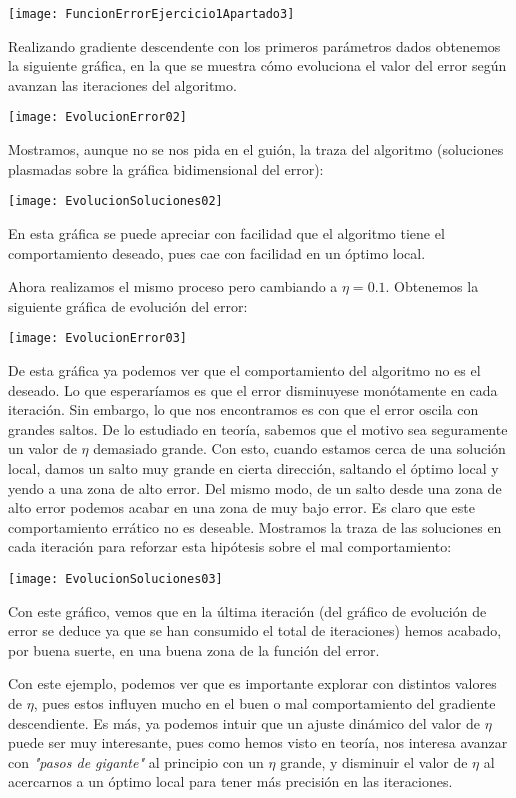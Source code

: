 \documentclass[11pt]{article}
\begin{document}
\texttt{[image: FuncionErrorEjercicio1Apartado3]}

Realizando gradiente descendente con los primeros parámetros dados obtenemos la siguiente gráfica, en la que se muestra cómo evoluciona el valor del error según avanzan las iteraciones del algoritmo.

\texttt{[image: EvolucionError02]}

Mostramos, aunque no se nos pida en el guión, la traza del algoritmo (soluciones plasmadas sobre la gráfica bidimensional del error):

\texttt{[image: EvolucionSoluciones02]}

En esta gráfica se puede apreciar con facilidad que el algoritmo tiene el comportamiento deseado, pues cae con facilidad en un óptimo local.

Ahora realizamos el mismo proceso pero cambiando a $\eta = 0.1$. Obtenemos la siguiente gráfica de evolución del error:

\texttt{[image: EvolucionError03]}

De esta gráfica ya podemos ver que el comportamiento del algoritmo no es el deseado. Lo que esperaríamos es que el error disminuyese monótamente en cada iteración. Sin embargo, lo que nos encontramos es con que el error oscila con grandes saltos. De lo estudiado en teoría, sabemos que el motivo sea seguramente un valor de $\eta$ demasiado grande. Con esto, cuando estamos cerca de una solución local, damos un salto muy grande en cierta dirección, saltando el óptimo local y yendo a una zona de alto error. Del mismo modo, de un salto desde una zona de alto error podemos acabar en una zona de muy bajo error. Es claro que este comportamiento errático no es deseable. Mostramos la traza de las soluciones en cada iteración para reforzar esta hipótesis sobre el mal comportamiento:

\texttt{[image: EvolucionSoluciones03]}

Con este gráfico, vemos que en la última iteración (del gráfico de evolución de error se deduce ya que se han consumido el total de iteraciones) hemos acabado, por buena suerte, en una buena zona de la función del error.

Con este ejemplo, podemos ver que es importante explorar con distintos valores de $\eta$, pues estos influyen mucho en el buen o mal comportamiento del gradiente descendiente. Es más, ya podemos intuir que un ajuste dinámico del valor de $\eta$ puede ser muy interesante, pues como hemos visto en teoría, nos interesa avanzar con \emph{"pasos de gigante"} al principio con un $\eta$ grande, y disminuir el valor de $\eta$ al acercarnos a un óptimo local para tener más precisión en las iteraciones.
\end{document}
